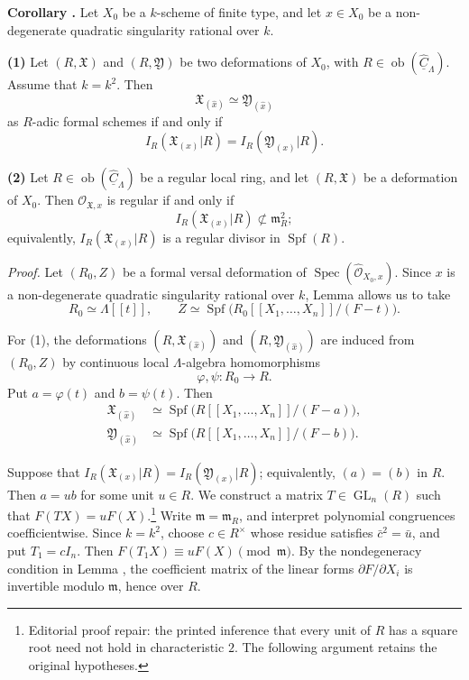 \par\medskip
\noindent\textbf{Corollary .}
Let $X_0$ be a $k$-scheme of finite type, and let $x\in X_0$ be a
non-degenerate quadratic singularity rational over $k$.

\smallskip
\noindent\textbf{(1)} Let $(R,\mathfrak X)$ and
$(R,\mathfrak Y)$ be two deformations of $X_0$, with
$R\in\operatorname{ob}(\widehat{\underline C}_\Lambda)$. Assume that
$k=k^2$. Then
\[
\mathfrak X_{(\widehat x)}\simeq
\mathfrak Y_{(\widehat x)}
\]
as $R$-adic formal schemes if and only if
\[
I_R(\mathfrak X_{(x)}|R)=I_R(\mathfrak Y_{(x)}|R).
\]

\smallskip
\noindent\textbf{(2)} Let
$R\in\operatorname{ob}(\widehat{\underline C}_\Lambda)$ be a regular
local ring, and let $(R,\mathfrak X)$ be a deformation of $X_0$.
Then $\mathcal O_{\mathfrak X,x}$ is regular if and only if
\[
I_R(\mathfrak X_{(x)}|R)\not\subset\mathfrak m_R^2;
\]
equivalently, $I_R(\mathfrak X_{(x)}|R)$ is a regular divisor in
$\operatorname{Spf}(R)$.

\smallskip
\noindent\textit{Proof.}
Let $(R_0,Z)$ be a formal versal deformation of
$\operatorname{Spec}(\widehat{\mathcal O}_{X_0,x})$. Since $x$ is a
non-degenerate quadratic singularity rational over $k$, Lemma 
allows us to take
\[
R_0\simeq\Lambda[[t]],
\qquad
Z\simeq\operatorname{Spf}
 \bigl(R_0[[X_1,\ldots,X_n]]/(F-t)\bigr).
\]

For (1), the deformations
$(R,\mathfrak X_{(\widehat x)})$ and
$(R,\mathfrak Y_{(\widehat x)})$ are induced from $(R_0,Z)$ by
continuous local $\Lambda$-algebra homomorphisms
\[
\varphi,\psi:R_0\longrightarrow R.
\]
Put $a=\varphi(t)$ and $b=\psi(t)$. Then
\[
\begin{aligned}
\mathfrak X_{(\widehat x)}
&\simeq\operatorname{Spf}
 \bigl(R[[X_1,\ldots,X_n]]/(F-a)\bigr),\\
\mathfrak Y_{(\widehat x)}
&\simeq\operatorname{Spf}
 \bigl(R[[X_1,\ldots,X_n]]/(F-b)\bigr).
\end{aligned}
\]


Suppose that
$I_R(\mathfrak X_{(x)}|R)=I_R(\mathfrak Y_{(x)}|R)$; equivalently,
$(a)=(b)$ in $R$. Then $a=ub$ for some unit $u\in R$. We construct a matrix $T\in\operatorname{GL}_n(R)$ such that
$F(TX)=uF(X)$.\footnote{Editorial proof repair: the printed inference that
every unit of $R$ has a square root need not hold in characteristic $2$.
The following argument retains the original hypotheses.}
Write $\mathfrak m=\mathfrak m_R$, and interpret polynomial congruences
coefficientwise. Since $k=k^2$, choose $c\in R^\times$ whose residue
satisfies $\bar c^2=\bar u$, and put $T_1=cI_n$. Then
$F(T_1X)\equiv uF(X)\pmod{\mathfrak m}$.
By the nondegeneracy condition in Lemma , the coefficient matrix of
the linear forms $\partial F/\partial X_i$ is invertible modulo
$\mathfrak m$, hence over $R$.


